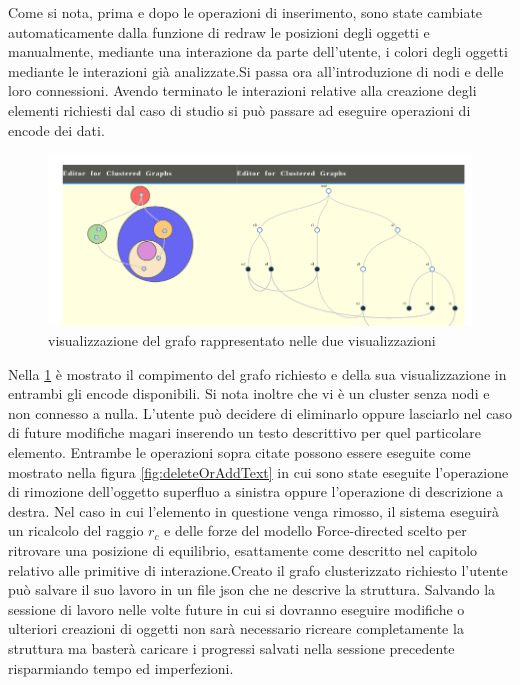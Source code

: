 {Come si nota, prima e dopo le operazioni di inserimento, sono state cambiate automaticamente dalla funzione di redraw le posizioni degli oggetti e manualmente, mediante una interazione da parte dell'utente, i colori degli oggetti mediante le interazioni già analizzate.Si passa ora all'introduzione di nodi e delle loro connessioni.
Avendo terminato le interazioni relative alla creazione degli elementi richiesti dal caso di studio si può passare ad eseguire operazioni di encode dei dati.
\newpage
\begin{figure}[!htb]
	\begin{center}
		\includegraphics[width=1 \linewidth]{figure/views}
	\end{center}
	\caption{visualizzazione del grafo rappresentato nelle due visualizzazioni \label{fig:views}}
\end{figure}
Nella \figurename{\ref{fig:views}} è mostrato il compimento del grafo richiesto e della sua visualizzazione in entrambi gli encode disponibili. Si nota inoltre che vi è un cluster senza nodi e non connesso a nulla. L'utente può decidere di eliminarlo oppure lasciarlo nel caso di future modifiche magari inserendo un testo descrittivo per quel particolare elemento. Entrambe le operazioni sopra citate possono essere eseguite come mostrato nella figura \figurename{\ref{fig:deleteOrAddText}} in cui sono state eseguite l'operazione di rimozione dell'oggetto superfluo a sinistra oppure l'operazione di descrizione a destra. Nel caso in cui l'elemento in questione venga rimosso, il sistema eseguirà un ricalcolo del raggio $r_c$ e delle forze del modello Force-directed scelto per ritrovare una posizione di equilibrio, esattamente come descritto nel capitolo relativo alle primitive di interazione.Creato il grafo clusterizzato richiesto l'utente può salvare il suo lavoro in un file json che ne descrive la struttura. Salvando la sessione di lavoro nelle volte future in cui si dovranno eseguire modifiche o ulteriori creazioni di oggetti non sarà necessario ricreare completamente la struttura ma basterà caricare i progressi salvati nella sessione precedente risparmiando tempo ed imperfezioni.
}
